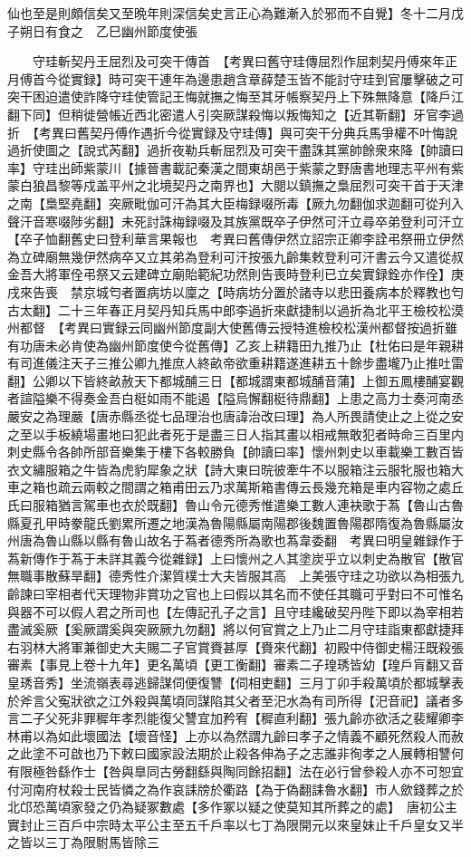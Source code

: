 仙也至是則頗信矣又至晩年則深信矣史言正心為難漸入於邪而不自覺】冬十二月戊子朔日有食之　乙巳幽州節度使張

　　守珪斬契丹王屈烈及可突干傳首　【考異曰舊守珪傳屈烈作屈刺契丹傅來年正月傅首今從實録】時可突干連年為邊患趙含章薛楚玉皆不能討守珪到官屢擊破之可突干困迫遣使詐降守珪使管記王悔就撫之悔至其牙帳察契丹上下殊無降意【降戶江翻下同】但稍徙營帳近西北密遣人引突厥謀殺悔以叛悔知之【近其靳翻】牙官李過折　【考異曰舊契丹傅作遇折今從實録及守珪傳】與可突干分典兵馬爭權不叶悔說過折使圖之【說式芮翻】過折夜勒兵斬屈烈及可突干盡誅其黨帥餘衆來降【帥讀曰率】守珪出師紫蒙川【據晉書載記秦漢之間東胡邑于紫蒙之野唐書地理志平州有紫蒙白狼昌黎等戍盖平州之北境契丹之南界也】大閱以鎮撫之梟屈烈可突干首于天津之南【梟堅堯翻】突厥毗伽可汗為其大臣梅録啜所毒【厥九勿翻伽求迦翻可從刋入聲汗音寒啜陟劣翻】未死討誅梅録啜及其族黨既卒子伊然可汗立尋卒弟登利可汗立【卒子恤翻舊史曰登利華言果報也　考異曰舊傳伊然立詔宗正卿李詮弔祭冊立伊然為立碑廟無幾伊然病卒又立其弟為登利可汗按張九齡集敕登利可汗書云今又遣從叔金吾大將軍佺弔祭又云建碑立廟貽範紀功然則告喪時登利已立矣實録銓亦作佺】庚戌來告喪　禁京城匄者置病坊以廩之【時病坊分置於諸寺以悲田養病本於釋教也匄古太翻】二十三年春正月契丹知兵馬中郎李過折來獻捷制以過折為北平王檢校松漠州都督　【考異曰實録云同幽州節度副大使舊傳云授特進檢校松漢州都督按過折雖有功唐未必肯使為幽州節度使今從舊傳】乙亥上耕籍田九推乃止【杜佑曰是年親耕有司進儀注天子三推公卿九推庶人終畝帝欲重耕籍遂進耕五十餘步盡壠乃止推吐雷翻】公卿以下皆終畝赦天下都城酺三日【都城謂東都城酺音蒲】上御五鳳樓酺宴觀者諠隘樂不得奏金吾白梃如雨不能遏【隘烏懈翻梃待鼎翻】上患之高力士奏河南丞嚴安之為理嚴【唐赤縣丞從七品理治也唐諱治改曰理】為人所畏請使止之上從之安之至以手板繞場畫地曰犯此者死于是盡三日人指其畫以相戒無敢犯者時命三百里内刺史縣令各帥所部音樂集于樓下各較勝負【帥讀曰率】懷州刺史以車載樂工數百皆衣文繡服箱之牛皆為虎豹犀象之狀【詩大東曰晥彼牽牛不以服箱注云服牝服也箱大車之箱也疏云兩較之間謂之箱甫田云乃求萬斯箱書傳云長幾充箱是車内容物之處丘氏曰服箱猶言駕車也衣於既翻】魯山令元德秀惟遣樂工數人連袂歌于蒍【魯山古魯縣夏孔甲時豢龍氏劉累所遷之地漢為魯陽縣屬南陽郡後魏置魯陽郡隋復為魯縣屬汝州唐為魯山縣以縣有魯山故名于蒍者德秀所為歌也蒍韋委翻　考異曰明皇雜録作于蒍新傳作于蒍于未詳其義今從雜録】上曰懷州之人其塗炭乎立以刺史為散官【散官無職事散蘇旱翻】德秀性介潔質樸士大夫皆服其高　上美張守珪之功欲以為相張九齡諫曰宰相者代天理物非賞功之官也上曰假以其名而不使任其職可乎對曰不可惟名與器不可以假人君之所司也【左傳記孔子之言】且守珪纔破契丹陛下即以為宰相若盡滅奚厥【奚厥謂奚與突厥厥九勿翻】將以何官賞之上乃止二月守珪詣東都獻捷拜右羽林大將軍兼御史大夫賜二子官賞賚甚厚【賚來代翻】初殿中侍御史楊汪既殺張審素【事見上卷十九年】更名萬頃【更工衡翻】審素二子瑝琇皆幼【瑝戶肓翻又音皇琇音秀】坐流嶺表尋逃歸謀伺便復讐【伺相吏翻】三月丁卯手殺萬頃於都城擊表於斧言父寃狀欲之江外殺與萬頃同謀陷其父者至汜水為有司所得【汜音祀】議者多言二子父死非罪穉年孝烈能復父讐宜加矜宥【穉直利翻】張九齡亦欲活之裴耀卿李林甫以為如此壞國法【壞音怪】上亦以為然謂九齡曰孝子之情義不顧死然殺人而赦之此塗不可啟也乃下敕曰國家設法期於止殺各伸為子之志誰非徇孝之人展轉相讐何有限極咎繇作士【咎與臯同古勞翻繇與陶同餘招翻】法在必行曾參殺人亦不可恕宜付河南府杖殺士民皆憐之為作哀誄牓於衢路【為于偽翻誄魯水翻】市人歛錢葬之於北邙恐萬頃家發之仍為疑冢數處【多作冢以疑之使莫知其所葬之的處】　唐初公主實封止三百戶中宗時太平公主至五千戶率以七丁為限開元以來皇妹止千戶皇女又半之皆以三丁為限駙馬皆除三